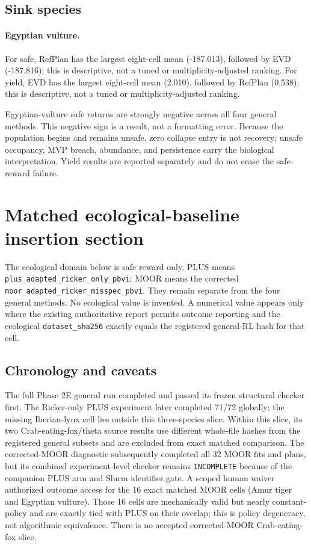 \documentclass[10pt]{article}
\begin{document}
\subsection{Sink species}

\paragraph{Egyptian vulture.} For safe, RefPlan has the largest eight-cell mean (-187.013), followed by EVD (-187.816); this is descriptive, not a tuned or multiplicity-adjusted ranking. For yield, EVD has the largest eight-cell mean (2.010), followed by RefPlan (0.538); this is descriptive, not a tuned or multiplicity-adjusted ranking.

Egyptian-vulture safe returns are strongly negative across all four general methods. This negative
sign is a result, not a formatting error. Because the population begins and remains unsafe, zero
collapse entry is not recovery; unsafe occupancy, MVP breach, abundance, and persistence carry the
biological interpretation. Yield results are reported separately and do not erase the safe-reward
failure.

\section{Matched ecological-baseline insertion section}
The ecological domain below is safe reward only. PLUS means
\texttt{plus\_adapted\_ricker\_only\_pbvi}; MOOR means the corrected
\texttt{moor\_adapted\_ricker\_misspec\_pbvi}. They remain separate from the four general methods.
No ecological value is invented. A numerical value appears only where the existing authoritative
report permits outcome reporting and the ecological \texttt{dataset\_sha256} exactly equals the
registered general-RL hash for that cell.

\subsection{Chronology and caveats}
The full Phase 2E general run completed and passed its frozen structural checker first. The
Ricker-only PLUS experiment later completed 71/72 globally; the missing Iberian-lynx cell lies
outside this three-species slice. Within this slice, its two Crab-eating-fox/theta source results use
different whole-file hashes from the registered general subsets and are excluded from exact matched
comparison. The corrected-MOOR diagnostic subsequently completed all 32 MOOR fits and plans, but
its combined experiment-level checker remains \texttt{INCOMPLETE} because of the companion PLUS arm
and Slurm identifier gate. A scoped human waiver authorized outcome access for the 16 exact matched
MOOR cells (Amur tiger and Egyptian vulture). Those 16 cells are mechanically valid but nearly
constant-policy and are exactly tied with PLUS on their overlap; this is policy degeneracy, not
algorithmic equivalence. There is no accepted corrected-MOOR Crab-eating-fox slice.
\end{document}
